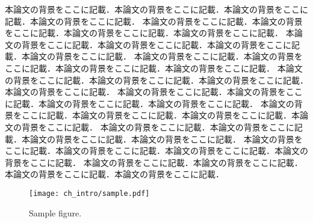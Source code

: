 本論文の背景をここに記載．本論文の背景をここに記載．本論文の背景をここに記載．本論文の背景をここに記載．
本論文の背景をここに記載．本論文の背景をここに記載．本論文の背景をここに記載．本論文の背景をここに記載．
本論文の背景をここに記載．本論文の背景をここに記載．本論文の背景をここに記載．本論文の背景をここに記載．
本論文の背景をここに記載．本論文の背景をここに記載．本論文の背景をここに記載．本論文の背景をここに記載．
本論文の背景をここに記載．本論文の背景をここに記載．本論文の背景をここに記載．本論文の背景をここに記載．
本論文の背景をここに記載．本論文の背景をここに記載．本論文の背景をここに記載．本論文の背景をここに記載．
本論文の背景をここに記載．本論文の背景をここに記載．本論文の背景をここに記載．本論文の背景をここに記載．
本論文の背景をここに記載．本論文の背景をここに記載．本論文の背景をここに記載．本論文の背景をここに記載．
本論文の背景をここに記載．本論文の背景をここに記載．本論文の背景をここに記載．本論文の背景をここに記載．
本論文の背景をここに記載．本論文の背景をここに記載．本論文の背景をここに記載．本論文の背景をここに記載．
\begin{figure}[!t]
\centering
\texttt{[image: ch\_intro/sample.pdf]}
\caption{Sample figure.}
\label{fig:intro:sample}
\end{figure}

